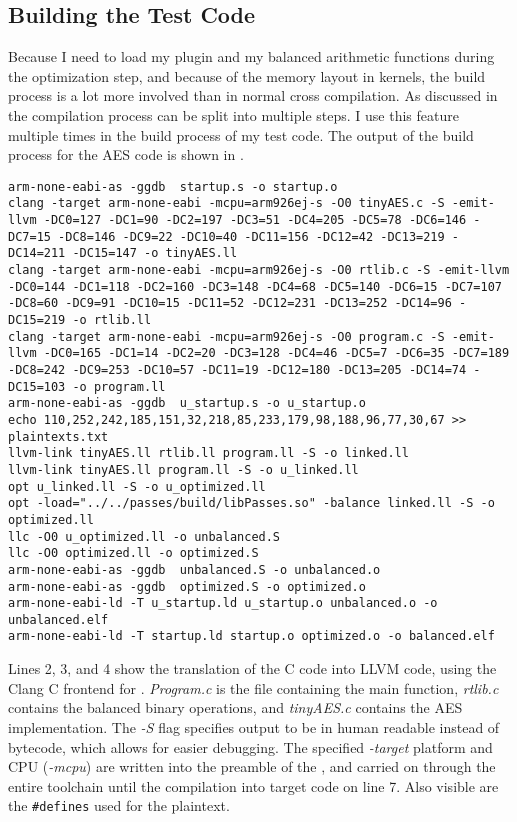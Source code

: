 \subsection{Building the Test Code}
\label{buildtest}
Because I need to load my plugin and my balanced arithmetic functions during the optimization step, and because of the memory layout in \qemu{} kernels, the build process is a lot more involved than in normal cross compilation.
As discussed in  the \llvm{} compilation process can be split into multiple steps.
I use this feature multiple times in the build process of my test code.
The output of the build process for the AES code is shown in .

\newpage
\begin{lstlisting}[caption=Output of the Makefile, label=lst:makefile-output]
arm-none-eabi-as -ggdb  startup.s -o startup.o
clang -target arm-none-eabi -mcpu=arm926ej-s -O0 tinyAES.c -S -emit-llvm -DC0=127 -DC1=90 -DC2=197 -DC3=51 -DC4=205 -DC5=78 -DC6=146 -DC7=15 -DC8=146 -DC9=22 -DC10=40 -DC11=156 -DC12=42 -DC13=219 -DC14=211 -DC15=147 -o tinyAES.ll
clang -target arm-none-eabi -mcpu=arm926ej-s -O0 rtlib.c -S -emit-llvm -DC0=144 -DC1=118 -DC2=160 -DC3=148 -DC4=68 -DC5=140 -DC6=15 -DC7=107 -DC8=60 -DC9=91 -DC10=15 -DC11=52 -DC12=231 -DC13=252 -DC14=96 -DC15=219 -o rtlib.ll
clang -target arm-none-eabi -mcpu=arm926ej-s -O0 program.c -S -emit-llvm -DC0=165 -DC1=14 -DC2=20 -DC3=128 -DC4=46 -DC5=7 -DC6=35 -DC7=189 -DC8=242 -DC9=253 -DC10=57 -DC11=19 -DC12=180 -DC13=205 -DC14=74 -DC15=103 -o program.ll
arm-none-eabi-as -ggdb  u_startup.s -o u_startup.o
echo 110,252,242,185,151,32,218,85,233,179,98,188,96,77,30,67 >> plaintexts.txt
llvm-link tinyAES.ll rtlib.ll program.ll -S -o linked.ll
llvm-link tinyAES.ll program.ll -S -o u_linked.ll
opt u_linked.ll -S -o u_optimized.ll
opt -load="../../passes/build/libPasses.so" -balance linked.ll -S -o optimized.ll
llc -O0 u_optimized.ll -o unbalanced.S
llc -O0 optimized.ll -o optimized.S
arm-none-eabi-as -ggdb  unbalanced.S -o unbalanced.o
arm-none-eabi-as -ggdb  optimized.S -o optimized.o
arm-none-eabi-ld -T u_startup.ld u_startup.o unbalanced.o -o unbalanced.elf
arm-none-eabi-ld -T startup.ld startup.o optimized.o -o balanced.elf
\end{lstlisting}

Lines 2, 3, and 4 show the translation of the C code into LLVM code, using the Clang\cite{lattner2008llvm} C frontend for \llvm{}.
\emph{Program.c} is the file containing the main function, \emph{rtlib.c} contains the balanced binary operations, and \emph{tinyAES.c} contains the AES implementation.
The \emph{-S} flag specifies output to be in human readable \ir{} instead of bytecode, which allows for easier debugging.
The specified \emph{-target} platform and CPU (\emph{-mcpu}) are written into the preamble of the \ir{}, and carried on through the entire toolchain until the compilation into target code on line 7.
Also visible are the \texttt{\#defines} used for the plaintext.

